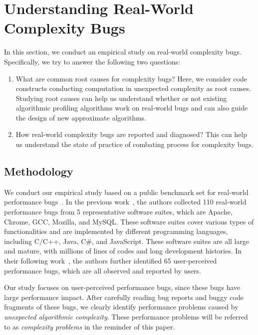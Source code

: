 \section{Understanding Real-World Complexity Bugs}
\label{sec:study}


In this section, we conduct an empirical study on real-world complexity bugs. 
Specifically, we try to answer the following two questions:

\begin{enumerate}

\item What are common root causes for complexity bugs? 
Here, we consider code constructs conducting computation in unexpected complexity as root causes. 
Studying root causes can help us understand whether or not 
existing algorithmic profiling algorithms work on real-world bugs 
and can also guide the design of new approximate algorithms. 

\item How real-world complexity bugs are reported and diagnosed?
This can help us understand the state of practice of combating process for complexity bugs. 

\end{enumerate}


\subsection{Methodology}
\label{sec:meth}

We conduct our empirical study based on a public benchmark set for 
real-world performance bugs~\cite{PerfBug,SongOOPSLA2014}. 
In the previous work~\cite{PerfBug}, 
the authors collected 110 real-world performance bugs from 5 representative 
software suites, which are Apache, Chrome, GCC, Mozilla, and MySQL. 
These software suites cover various types of functionalities and are implemented 
by different programming languages, including C/C++, Java, C\#, and JavaScript. 
These software suites are all large and mature, 
with millions of lines of codes and long development histories. 
In their following work~\cite{SongOOPSLA2014}, 
the authors further identified 65 user-perceived performance bugs, 
which are all observed and reported by users. 


Our study focuses on user-perceived performance bugs, 
since these bugs have large performance impact.
After carefully reading bug reports and buggy code fragments of these bugs,
we clearly identify \ComBugs performance problems 
caused by {\textit{unexpected algorithmic complexity}}.
These performance problems will be referred to as 
{\textit{complexity problems}} in the reminder of this paper.


